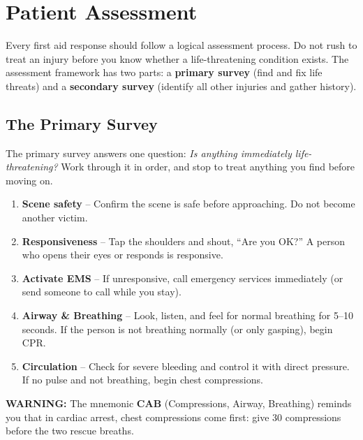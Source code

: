 \chapter{Patient Assessment}\label{ch:assessment}

Every first aid response should follow a logical assessment process. Do not rush to treat an injury before you know whether a life-threatening condition exists. The assessment framework has two parts: a \textbf{primary survey} (find and fix life threats) and a \textbf{secondary survey} (identify all other injuries and gather history).

\section{The Primary Survey}

The primary survey answers one question: \emph{Is anything immediately life-threatening?} Work through it in order, and stop to treat anything you find before moving on.

\begin{enumerate}[leftmargin=*]
\item \textbf{Scene safety} -- Confirm the scene is safe before approaching. Do not become another victim.
\item \textbf{Responsiveness} -- Tap the shoulders and shout, ``Are you OK?'' A person who opens their eyes or responds is responsive.
\item \textbf{Activate EMS} -- If unresponsive, call emergency services immediately (or send someone to call while you stay).
\item \textbf{Airway \& Breathing} -- Look, listen, and feel for normal breathing for 5--10 seconds. If the person is not breathing normally (or only gasping), begin CPR.
\item \textbf{Circulation} -- Check for severe bleeding and control it with direct pressure. If no pulse and not breathing, begin chest compressions.
\end{enumerate}

\textbf{WARNING:} The mnemonic \textbf{CAB} (Compressions, Airway, Breathing) reminds you that in cardiac arrest, chest compressions come first: give 30 compressions before the two rescue breaths.


